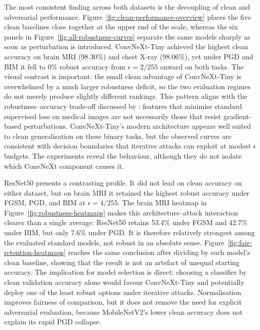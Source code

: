 \documentclass[12pt,a4paper,oneside]{report}
\begin{document}
The most consistent finding across both datasets is the decoupling of clean and adversarial performance. Figure~\ref{fig:clean-performance-overview} places the five clean baselines close together at the upper end of the scale, whereas the six panels in Figure~\ref{fig:all-robustness-curves} separate the same models sharply as soon as perturbation is introduced. ConvNeXt-Tiny achieved the highest clean accuracy on brain MRI (98.30\%) and chest X-ray (98.06\%), yet under PGD and BIM it fell to 0\% robust accuracy from $\epsilon = 2/255$ onward on both tasks. The visual contrast is important: the small clean advantage of ConvNeXt-Tiny is overwhelmed by a much larger robustness deficit, so the two evaluation regimes do not merely produce slightly different rankings. This pattern aligns with the robustness--accuracy trade-off discussed by \citet{tsipras2019robustness}: features that minimise standard supervised loss on medical images are not necessarily those that resist gradient-based perturbations. ConvNeXt-Tiny's modern architecture appears well suited to clean generalisation on these binary tasks, but the observed curves are consistent with decision boundaries that iterative attacks can exploit at modest $\epsilon$ budgets. The experiments reveal the behaviour, although they do not isolate which ConvNeXt component causes it.

ResNet50 presents a contrasting profile. It did not lead on clean accuracy on either dataset, but on brain MRI it retained the highest robust accuracy under FGSM, PGD, and BIM at $\epsilon = 4/255$. The brain MRI heatmap in Figure~\ref{fig:robustness-heatmaps} makes this architecture--attack interaction clearer than a single average: ResNet50 retains 53.4\% under FGSM and 42.7\% under BIM, but only 7.6\% under PGD. It is therefore relatively strongest among the evaluated standard models, not robust in an absolute sense. Figure~\ref{fig:fair-retention-heatmaps} reaches the same conclusion after dividing by each model's clean baseline, showing that the result is not an artefact of unequal starting accuracy. The implication for model selection is direct: choosing a classifier by clean validation accuracy alone would favour ConvNeXt-Tiny and potentially deploy one of the least robust options under iterative attacks. Normalisation improves fairness of comparison, but it does not remove the need for explicit adversarial evaluation, because MobileNetV2's lower clean accuracy does not explain its rapid PGD collapse.
\end{document}
